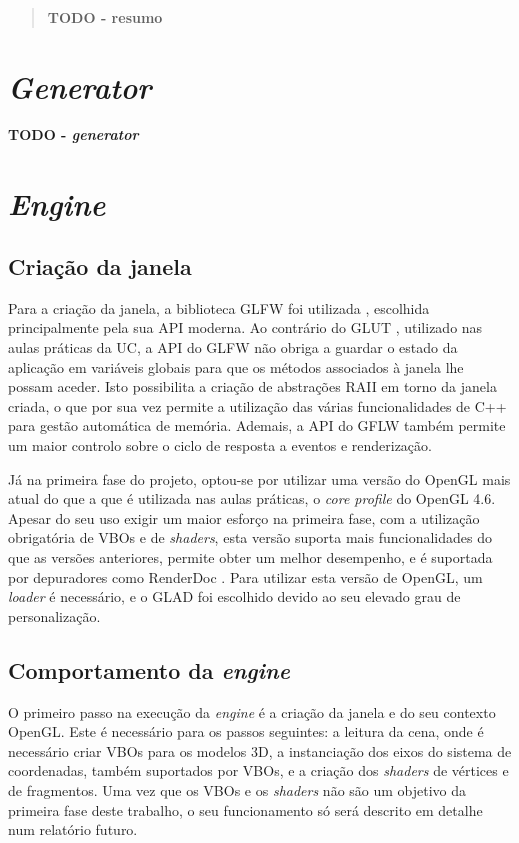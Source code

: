 \documentclass[12pt, a4paper]{article}
\begin{document}
\pagebreak

\begin{abstract}
    \textbf{\color{red} TODO - resumo}
\end{abstract}

\section{\emph{Generator}}

\textbf{\color{red} TODO - \emph{generator}}

\section{\emph{Engine}}

\subsection{Criação da janela}

Para a criação da janela, a biblioteca GLFW foi utilizada \cite{glfw}, escolhida principalmente pela
sua API moderna. Ao contrário do GLUT \cite{glut}, utilizado nas aulas práticas da UC, a API do GLFW
não obriga a guardar o estado da aplicação em variáveis globais para que os métodos associados à
janela lhe possam aceder. Isto possibilita a criação de abstrações RAII em torno da janela criada, o
que por sua vez permite a utilização das várias funcionalidades de C++ para gestão automática de
memória. Ademais, a API do GFLW também permite um maior controlo sobre o ciclo de resposta a eventos
e renderização.

Já na primeira fase do projeto, optou-se por utilizar uma versão do OpenGL mais atual do que a que é
utilizada nas aulas práticas, o \emph{core profile} do OpenGL 4.6. Apesar do seu uso exigir um maior
esforço na primeira fase, com a utilização obrigatória de VBOs e de \emph{shaders}, esta versão
suporta mais funcionalidades do que as versões anteriores, permite obter um melhor desempenho, e é
suportada por depuradores como RenderDoc \cite{renderdoc}. Para utilizar esta versão de OpenGL, um
\emph{loader} é necessário, e o GLAD \cite{glad} foi escolhido devido ao seu elevado grau de
personalização.

\subsection{Comportamento da \emph{engine}}

O primeiro passo na execução da \emph{engine} é a criação da janela e do seu contexto OpenGL. Este é
necessário para os passos seguintes: a leitura da cena, onde é necessário criar VBOs para os
modelos 3D, a instanciação dos eixos do sistema de coordenadas, também suportados por VBOs, e a
criação dos \emph{shaders} de vértices e de fragmentos. Uma vez que os VBOs e os \emph{shaders} não
são um objetivo da primeira fase deste trabalho, o seu funcionamento só será descrito em detalhe num
relatório futuro.
\end{document}
